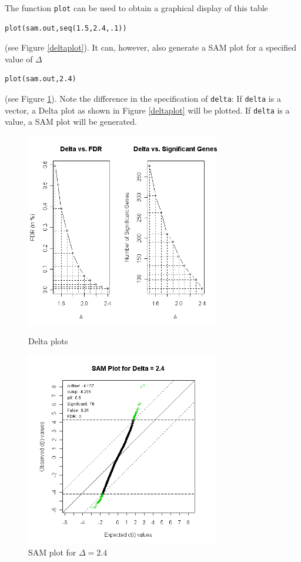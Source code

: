 \documentclass[a4paper]{article}
\begin{document}
The function \texttt{plot} can be used to obtain a graphical display of this table

\begin{verbatim}
plot(sam.out,seq(1.5,2.4,.1))
\end{verbatim}


(see Figure \ref{deltaplot}). It can, however, also generate a SAM plot for a specified value of
$\Delta$

\begin{verbatim}
plot(sam.out,2.4)
\end{verbatim}

(see Figure \ref{samplot}). Note the difference in the specification of \texttt{delta}: If \texttt{delta}
is a vector, a Delta plot as shown in Figure \ref{deltaplot} will be plotted. If \texttt{delta} is a value,
a SAM plot will be generated.

\begin{figure}[!ht]
\vspace{18pt} \small
\centerline{
\includegraphics[width=8.5cm]{deltaplot}}\vspace{-15pt}
\caption{Delta plots}\label{deltaplot}

\vspace*{36pt}

\centerline{
\includegraphics[width=8.5cm]{samplot}}\vspace{-15pt}
\caption{SAM plot for $\Delta=2.4$}\label{samplot}
\vspace*{18pt}
\end{figure}
\end{document}
